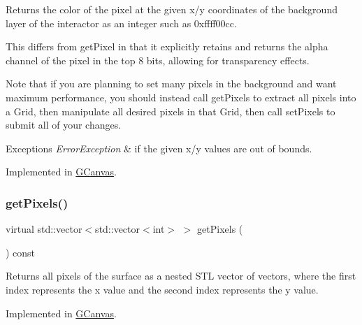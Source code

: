 Returns the color of the pixel at the given x/y coordinates of the background layer of the interactor as an integer such as 0xffff00cc. 

This differs from get\+Pixel in that it explicitly retains and returns the alpha channel of the pixel in the top 8 bits, allowing for transparency effects.

Note that if you are planning to set many pixels in the background and want maximum performance, you should instead call get\+Pixels to extract all pixels into a Grid, then manipulate all desired pixels in that Grid, then call set\+Pixels to submit all of your changes.


\begin{DoxyExceptions}{Exceptions}
{\em Error\+Exception} & if the given x/y values are out of bounds. \\
\hline
\end{DoxyExceptions}


Implemented in \mbox{\hyperlink{classsgl_1_1GCanvas_ae28117ec01d58208d381fba886030850}{G\+Canvas}}.

\mbox{\label{classsgl_1_1GDrawingSurface_aaaa615cb8868420f5451082c843f8b73}} 
\subsubsection{\texorpdfstring{get\+Pixels()}{getPixels()}}
{\footnotesize\ttfamily virtual std\+::vector$<$std\+::vector$<$int$>$ $>$ get\+Pixels (\begin{DoxyParamCaption}{ }\end{DoxyParamCaption}) const\hspace{0.3cm}{\ttfamily [pure virtual]}}



Returns all pixels of the surface as a nested S\+TL vector of vectors, where the first index represents the x value and the second index represents the y value. 



Implemented in \mbox{\hyperlink{classsgl_1_1GCanvas_a41bea2a0b9f562b69f754a8b9bf4e711}{G\+Canvas}}.

\mbox{\label{classsgl_1_1GDrawingSurface_ad3338953d25c3863e554fa40f0529994}} 
